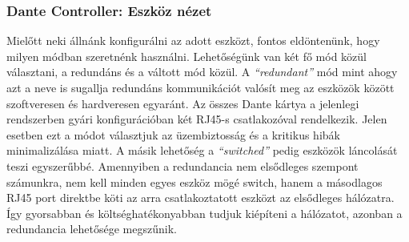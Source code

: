 \subsubsection{Dante Controller: Eszköz nézet}
Mielőtt neki állnánk konfigurálni az adott eszközt, fontos eldöntenünk, hogy
milyen módban szeretnénk használni.
Lehetőségünk van két fő mód közül választani, a redundáns és a
váltott mód közül. A \textit{``redundant''} mód mint ahogy azt a neve is sugallja
redundáns kommunikációt valósít meg az eszközök között szoftveresen és
hardveresen egyaránt. Az összes Dante kártya a jelenlegi rendszerben gyári konfigurációban két RJ45-s
csatlakozóval rendelkezik. Jelen esetben ezt a módot választjuk az
üzembiztosság és a kritikus hibák minimalizálása miatt.
A másik lehetőség a \textit{``switched''} pedig eszközök láncolását
teszi egyszerűbbé. Amennyiben a redundancia nem elsődleges szempont számunkra, nem kell
minden egyes eszköz mögé switch, hanem a másodlagos RJ45 port direktbe köti
az arra csatlakoztatott eszközt az elsődleges hálózatra. Így gyorsabban és
költséghatékonyabban tudjuk kiépíteni a hálózatot, azonban a redundancia lehetősége megszűnik.
